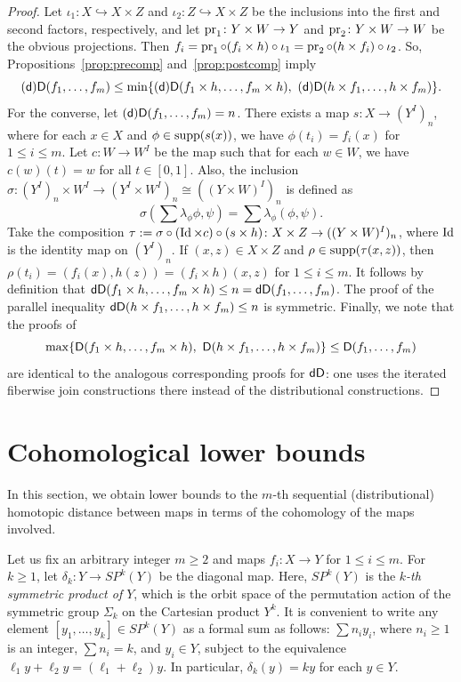 \documentclass[amscd,amssymb,verbatim,10pt]{amsart}
\numberwithin{equation}{section}
\theoremstyle{plain}
\theoremstyle{definition}
\DeclareMathOperator{\supp}{{\rm supp}}
\def\id{\protect\operatorname{Id}}
\def\pr{\protect\operatorname{pr}}
\newcommand{\D}{{\sf {D}}}
\newcommand{\sd}{{(\sf {d})}}
\newcommand{\dD}{{\sf {dD}}}
\begin{document}
\begin{proof}
    Let $\iota_1\colon X\hookrightarrow X\times Z$ and $\iota_2\colon Z\hookrightarrow X\times Z$ be the inclusions into the first and second factors, respectively, and let $\pr_1\colon Y\times W\to Y$ and $\pr_2\colon Y\times W\to W$ be the obvious projections.
    Then $f_i=\pr_1\circ (f_i\times h)\circ\iota_1=\pr_2\circ (h\times f_i)\circ\iota_2$. So, Propositions~\ref{prop:precomp} and~\ref{prop:postcomp} imply
    \[
    \sd\D(f_1,\dots,f_m)\le\min\{\sd\D(f_1\times h,\dots,f_m\times h),\  \sd\D(h\times f_1,\dots,h\times f_m)\}.
    \]
    For the converse, 
    let $\sd\D(f_1,\dots,f_m)=n$. There exists a map $s\colon X\to (Y^I)_n$, where for each $x\in X$ and $\phi\in\supp(s(x))$, we have $\phi(t_i)=f_i(x)$ for $1\le i \le m$. Let $c\colon W\to W^I$ be the map such that for each $w\in W$, we have $c(w)(t)=w$ for all $t\in [0,1]$. Also, the inclusion $\sigma\colon (Y^I)_n\times W^I\to (Y^I\times W^I)_n\cong((Y\times W)^I)_n$ is defined as 
    \[
\sigma\left(\sum\lambda_\phi\phi,\psi\right)=\sum \lambda_\phi\left(\phi,\psi\right).
    \]
    Take the composition $\tau:=\sigma\circ (\id\times c)\circ (s\times h)\colon X\times Z\to ((Y\times W)^I)_n$, where $\id$ is the identity map on $(Y^I)_n$. If $(x,z)\in X\times Z$ and $\rho\in\supp(\tau(x,z))$, then $\rho(t_i)=(f_i(x),h(z))=(f_i\times h)(x,z)$ for $1\le i \le m$. It follows by definition  that $\dD(f_1\times h,\dots,f_m\times h)\le n=\dD(f_1,\dots,f_m)$. The proof of the parallel inequality $\dD(h\times f_1,\dots,h\times f_m)\le n$ is symmetric. Finally, we note that the proofs of
    \[
    \max\{\D(f_1\times h,\dots,f_m\times h),\  \D(h\times f_1,\dots,h\times f_m)\}\le\D(f_1,\dots,f_m)
    \]
    are identical to the analogous corresponding proofs for $\dD$: one uses the iterated fiberwise join constructions there instead of the distributional constructions.
\end{proof}


\section{Cohomological lower bounds}\label{sec:cohombounds}

In this section, we obtain lower bounds to the $m$-th sequential (distributional) homotopic distance between maps in terms of the cohomology of the maps involved. 

Let us fix an arbitrary integer $m\ge 2$ and maps $f_i\colon X\to Y$ for $1\le i \le m$. For $k\ge 1$, let $\delta_k\colon Y\to SP^k(Y)$ be the diagonal map. Here, $SP^k(Y)$ is the \emph{$k$-th symmetric product of $Y$}, which is the orbit space of the permutation action of the symmetric group $\Sigma_k$ on the Cartesian product $Y^k$. It is convenient to write any element $[y_1,\dots,y_k]\in SP^k(Y)$ as a formal sum as follows: $\sum n_iy_i$, where $n_i\ge 1$ is an integer, $\sum n_i=k$, and $y_i\in Y$, subject to the equivalence $\ell_1y+\ell_2y=(\ell_1+\ell_2)y$. In particular, $\delta_k(y)=ky$ for each $y\in Y$. 
\end{document}
